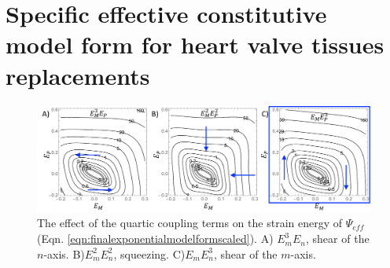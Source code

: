 \section{Specific effective constitutive model form for heart valve tissues replacements} \label{sec:specificform}

\begin{figure}
\centering
\includegraphics[width=6.5in]{Figures/couplingeffects}
\caption{The effect of the quartic coupling terms on the strain energy of $\Psi_{eff}$ (Eqn. \ref{eqn:finalexponentialmodelformscaled}). A) $E_m^3E_n$, shear of the $n$-axis. B)$E_m^2E_n^2$, squeezing. C)$E_mE_n^3$, shear of the $m$-axis.}
\label{fig:couplingeffects}
\end{figure}

